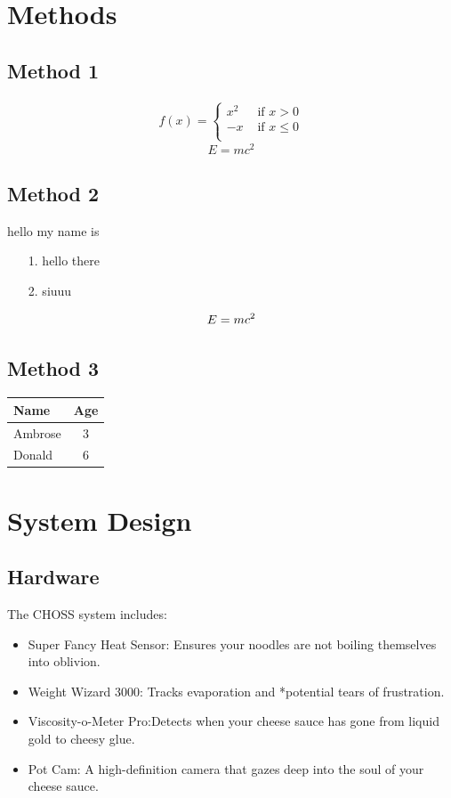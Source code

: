 \documentclass[twocolumn]{article}
\begin{document}
\section{Methods}
\subsection{Method 1}
\begin{align*}
f(x) = 
\begin{cases}
x^2 & \text{ if } x > 0 \\
-x & \text{ if } x \le 0 \\
\end{cases}
\end{align*}
\vspace{30pt}
\begin{equation}
E = mc^2
\end{equation}

\subsection{Method 2}
hello my name is
\begin{enumerate}
    \item[1.] hello there
    \item[2.] siuuu
\end{enumerate}


\begin{equation}
E = mc^2 \\ 
\end{equation}


\subsection{Method 3}
\begin{tabular}{|l|c|}
\hline
\textbf{Name} & \textbf{Age}\\ \hline
Ambrose & 3 \\ \hline
Donald & 6 \\ \hline
\end{tabular}

\section{System Design}
\subsection{Hardware}
The CHOSS system includes:
\begin{itemize}
\item Super Fancy Heat Sensor: Ensures your noodles are not boiling themselves into oblivion.
\item Weight Wizard 3000: Tracks evaporation and *potential tears of frustration.
\item Viscosity-o-Meter Pro:Detects when your cheese sauce has gone from liquid gold to cheesy glue.
\item Pot Cam: A high-definition camera that gazes deep into the soul of your cheese sauce.
\end{itemize}
\end{document}

